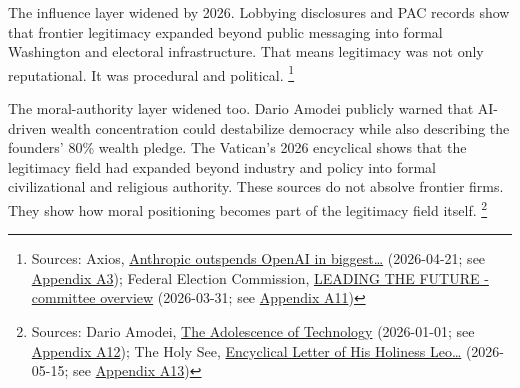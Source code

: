 \documentclass[
  american,
  11pt,
  letterpaper,
]{article}
\begin{document}
The influence layer widened by 2026. Lobbying disclosures and PAC
records show that frontier legitimacy expanded beyond public messaging
into formal Washington and electoral infrastructure. That means
legitimacy was not only reputational. It was procedural and political.
\footnote{Sources: Axios,
  \href{https://www.axios.com/2026/04/21/anthropic-outspends-openai-biggest-lobbying-quarter}{Anthropic
  outspends OpenAI in biggest\ldots{}} (2026-04-21; see
  \hyperref[appendix-a3-anthropic-outspends-openai-in-biggest-ever-lobbying-quarter]{Appendix
  A3}); Federal Election Commission,
  \href{https://www.fec.gov/data/committee/C00916114/}{LEADING THE
  FUTURE - committee overview} (2026-03-31; see
  \hyperref[appendix-a11-leading-the-future-committee-overview]{Appendix
  A11})}

The moral-authority layer widened too. Dario Amodei publicly warned that
AI-driven wealth concentration could destabilize democracy while also
describing the founders' 80\% wealth pledge. The Vatican's 2026
encyclical shows that the legitimacy field had expanded beyond industry
and policy into formal civilizational and religious authority. These
sources do not absolve frontier firms. They show how moral positioning
becomes part of the legitimacy field itself. \footnote{Sources: Dario
  Amodei,
  \href{https://darioamodei.com/essay/the-adolescence-of-technology}{The
  Adolescence of Technology} (2026-01-01; see
  \hyperref[appendix-a12-the-adolescence-of-technology]{Appendix A12});
  The Holy See,
  \href{https://www.vatican.va/content/leo-xiv/en/encyclicals/documents/20260515-magnifica-humanitas.html}{Encyclical
  Letter of His Holiness Leo\ldots{}} (2026-05-15; see
  \hyperref[appendix-a13-encyclical-letter-of-his-holiness-leo-xiv-magnifica-humanitas]{Appendix
  A13})}
\end{document}
